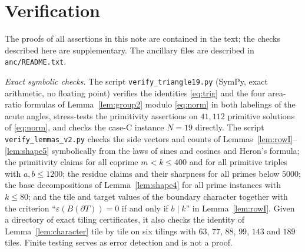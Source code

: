 \documentclass[11pt]{amsart}
\theoremstyle{remark}
\begin{document}
\section{Verification}\label{sec:verification}

The proofs of all assertions in this note are contained in the text; the checks described here are supplementary. The ancillary files are described in \texttt{anc/README.txt}.

\emph{Exact symbolic checks.} The script \texttt{verify\_triangle19.py} (SymPy, exact arithmetic, no floating point) verifies the identities \eqref{eq:trig} and the four area-ratio formulas of Lemma~\ref{lem:group2} modulo \eqref{eq:norm} in both labelings of the acute angles, stress-tests the primitivity assertions on $41{,}112$ primitive solutions of \eqref{eq:norm}, and checks the case-C instance $N=19$ directly. The script \texttt{verify\_lemmas\_v2.py} checks the side vectors and counts of Lemmas~\ref{lem:rowI}--\ref{lem:shape5} symbolically from the laws of sines and cosines and Heron's formula; the primitivity claims for all coprime $m<k\le400$ and for all primitive triples with $a,b\le1200$; the residue claims and their sharpness for all primes below $5000$; the base decompositions of Lemma~\ref{lem:shape4} for all prime instances with $k\le80$; and the tile and target values of the boundary character together with the criterion ``$\varepsilon(B(\partial T))=0$ if and only if $b\mid k$'' in Lemma~\ref{lem:rowI}. Given a directory of exact tiling certificates, it also checks the identity of Lemma~\ref{lem:character} tile by tile on six tilings with $63$, $77$, $88$, $99$, $143$ and $189$ tiles. Finite testing serves as error detection and is not a proof.
\end{document}
